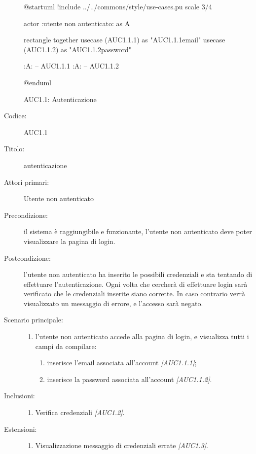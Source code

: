 \documentclass[casi-duso]{subfiles}
\begin{document}
\begin{figure}[h!]
  \centering
  \begin{plantuml}
  @startuml
  !include ../../commons/style/use-cases.pu
  scale 3/4

  actor :utente non autenticato: as A

  rectangle {
    together {
    usecase (AUC1.1.1) as "AUC1.1.1\nInserimento email"
    usecase (AUC1.1.2) as "AUC1.1.2\nInserimento password"
    }
  }

  :A: -- AUC1.1.1
  :A: -- AUC1.1.2

  @enduml
  \end{plantuml}
  \caption{AUC1.1: Autenticazione}
  \label{fig:auc1_1}
\end{figure}

\begin{description}
  \item[Codice:] AUC1.1
  \item[Titolo:] autenticazione
  \item[Attori primari:] Utente non autenticato
  \item[Precondizione:] il sistema è raggiungibile e funzionante, l'utente non autenticato deve poter visualizzare la pagina di login.
  \item[Postcondizione:] l'utente non autenticato ha inserito le possibili credenziali e sta tentando di effettuare l'autenticazione. Ogni volta che cercherà di effettuare
        login sarà verificato che le credenziali inserite siano corrette. In caso contrario verrà visualizzato un messaggio di errore, e l'accesso sarà negato.
  \item[Scenario principale:]
  \begin{enumerate}
    \item  l'utente non autenticato accede alla pagina di login, e visualizza tutti i campi da compilare:
    \begin{enumerate}
      \item inserisce l’email associata all’account \emph{[AUC1.1.1]};
      \item inserisce la password associata all’account \emph{[AUC1.1.2]}.
    \end{enumerate}
  \end{enumerate}
  \item[Inclusioni:]
  \begin{enumerate}
    \item Verifica credenziali \emph{[AUC1.2]}.
  \end{enumerate}
  \item[Estensioni:]
  \begin{enumerate}
    \item Visualizzazione messaggio di credenziali errate \emph{[AUC1.3]}.
  \end{enumerate}
\end{description}
\end{document}
